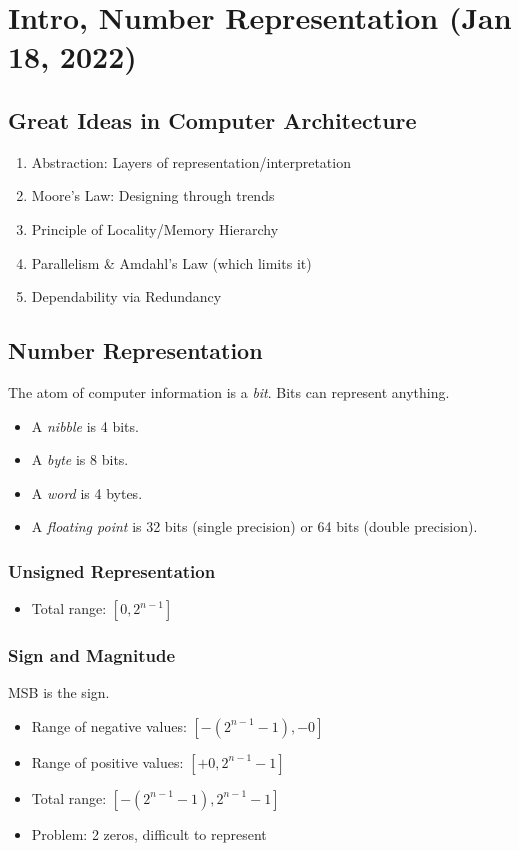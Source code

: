 \chapter{Intro, Number Representation (Jan 18, 2022)}

\section{Great Ideas in Computer Architecture}
\begin{enumerate}
    \item Abstraction: Layers of representation/interpretation
    \item Moore’s Law: Designing through trends
    \item Principle of Locality/Memory Hierarchy
    \item Parallelism \& Amdahl's Law (which limits it)
    \item Dependability via Redundancy
\end{enumerate}

\section{Number Representation}

The atom of computer information is a \emph{bit}. Bits can represent anything.
\begin{itemize}
    \item A \emph{nibble} is 4 bits.
    \item A \emph{byte} is 8 bits.
    \item A \emph{word} is 4 bytes.
    \item A \emph{floating point} is 32 bits (single precision) or 64 bits (double precision).
\end{itemize}

\subsection{Unsigned Representation}
\begin{itemize}
    \item Total range: \([0, 2^{n-1}]\)
\end{itemize}

\subsection{Sign and Magnitude}
MSB is the sign.
\begin{itemize}
	\item Range of negative values: \([-(2^{n-1}-1), -0]\)
	\item Range of positive values: \([+0, 2^{n-1}-1]\)
    \item Total range: \([-(2^{n-1}-1), 2^{n-1}-1]\)
    \item Problem: 2 zeros, difficult to represent
\end{itemize}
	
